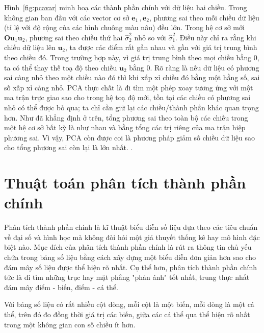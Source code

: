 \documentclass[../thesis.tex]{subfiles}
\begin{document}
Hình~\ref{fig:pcavar} minh hoạ các thành phần chính với dữ liệu hai chiều.
Trong không gian ban đầu với các vector cơ sở $\mathbf{e}_1\,,\mathbf{e}_2$, phương sai theo mỗi chiều dữ liệu (tỉ lệ với độ rộng của các hình chuông màu nâu) đều lớn. Trong hệ cơ sở mới $\mathbf{O}\mathbf{u}_1\mathbf{u}_2$, phương sai theo chiều thứ hai $\hat{\sigma}_2^2$ nhỏ so với $\hat{\sigma}_1^2$. Điều này chỉ ra rằng khi chiếu dữ liệu lên $\mathbf{u}_2$, ta được các điểm rất gần nhau và gần với giá trị trung bình theo chiều đó. Trong trường hợp này, vì giá trị trung bình theo mọi chiều bằng 0, ta có thể thay thế toạ độ theo chiều $\mathbf{u}_2$ bằng 0. Rõ ràng là nếu dữ liệu có phương sai càng nhỏ theo một chiều nào đó thì khi xấp xỉ chiều đó bằng một hằng số, sai số xấp xỉ càng nhỏ. PCA thực chất là đi tìm một phép xoay tương ứng với một ma trận trực giao sao cho trong hệ toạ độ mới, tồn tại các chiều có phương sai nhỏ có thể được bỏ qua; ta chỉ cần giữ lại các chiều/thành phần khác quan trọng hơn. Như đã khẳng định ở trên, tổng phương sai theo toàn bộ các chiều trong một hệ cơ sở bất kỳ là như nhau và bằng tổng các trị riêng của ma trận hiệp phương sai. Vì vậy, PCA còn được coi là phương pháp giảm số chiều dữ liệu sao cho tổng phương sai còn lại là lớn nhất. \cite{VuHuuTiep}. 

\section{Thuật toán phân tích thành phần chính}

Phân tích thành phần chính là kĩ thuật biểu diễn số liệu dựa theo các tiêu chuẩn về đại số và hình học mà không đòi hỏi một giả thuyết thống kê hay mô hình đặc biệt nào. Mục đích của phân tích thành phần chính là rút ra thông tin chủ yếu chứa trong  bảng số liệu bằng cách xây dựng một biểu diễn đơn giản hơn sao cho đám mây số  liệu được thể hiện rõ nhất. Cụ thể hơn, phân tích thành phần chính tức là đi tìm  những trục hay mặt phẳng "phản ánh" tốt nhất, trung thực nhất đám mây điểm - biến, điểm - cá thể. 

Với bảng số liệu có rất nhiều cột dòng, mỗi cột là một biến, mỗi dòng là một cá  thể, trên đó đo đồng thời giá trị các biến, giữa các cá thể qua thể hiện rõ nhất trong  một không gian con số chiều ít hơn.
\end{document}
